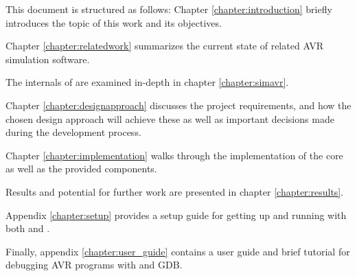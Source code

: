 This document is structured as follows: Chapter \ref{chapter:introduction} briefly
introduces the topic of this work and its objectives.


Chapter \ref{chapter:relatedwork} summarizes the current state of related \ac{AVR}
simulation software.

The internals of \simavr are examined in-depth in chapter \ref{chapter:simavr}.

Chapter \ref{chapter:designapproach} discusses the project requirements, and
how the chosen design approach will achieve these as well as important decisions
made during the development process.

Chapter \ref{chapter:implementation} walks through the implementation of the
\qsimavr core as well as the provided components.

Results and potential for further work are presented in chapter \ref{chapter:results}.

Appendix \ref{chapter:setup} provides a setup guide for getting up and running
with both \simavr and \qsimavr.

Finally, appendix \ref{chapter:user_guide} contains a \qsimavr user guide
and brief tutorial for debugging \ac{AVR} programs with \qsimavr and \ac{GDB}.
